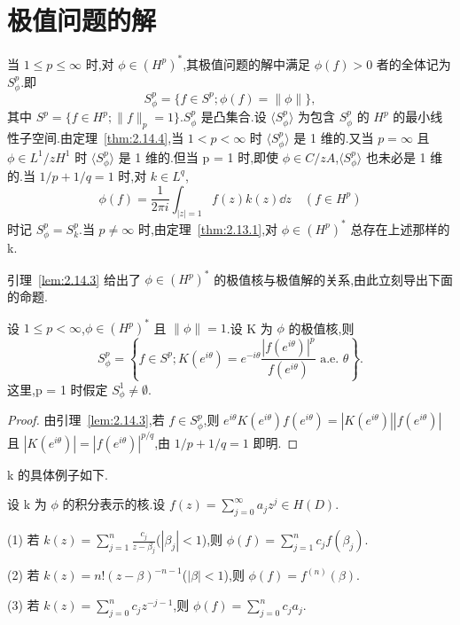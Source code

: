 \section{极值问题的解}\label{sec:2.16}

当 $1 \leq p \leq \infty$ 时,对 $\phi \in (H^{p})^{*}$,其极值问题的解中满足 $\phi(f) > 0$ 者的全体记为 $S_{\phi}^{p}$.即
\begin{equation*}
S_{\phi}^{p} = \{f \in S^{p}; \phi(f) = \|\phi\|\},
\end{equation*}
其中 $S^{p} = \{f \in H^{p}; \|f\|_{p} = 1\}$.$S_{\phi}^{p}$ 是凸集合.设 $\langle S_{\phi}^{p} \rangle$ 为包含 $S_{\phi}^{p}$ 的 $H^{p}$ 的最小线性子空间.由定理~\ref{thm:2.14.4},当 $1 < p < \infty$ 时 $\langle S_{\phi}^{p} \rangle$ 是 1 维的.又当 $p = \infty$ 且 $\phi \in L^{1}/zH^{1}$ 时 $\langle S_{\phi}^{p} \rangle$ 是 1 维的.但当 p = 1 时,即使 $\phi \in C/zA$,$\langle S_{\phi}^{p} \rangle$ 也未必是 1 维的.当 $1/p + 1/q = 1$ 时,对 $k \in L^{q}$,
\begin{equation*}
\phi(f) = \frac{1}{2\pi i}\int_{|z|=1} f(z) k(z)\dd z \quad (f \in H^{p})
\end{equation*}
时记 $S_{\phi}^{p} = S_{k}^{p}$.当 $p \neq \infty$ 时,由定理~\ref{thm:2.13.1},对 $\phi \in (H^{p})^{*}$ 总存在上述那样的 k.

引理~\ref{lem:2.14.3} 给出了 $\phi \in (H^{p})^{*}$ 的极值核与极值解的关系,由此立刻导出下面的命题.

\begin{proposition}\label{prop:2.16.1}
设 $1 \leq p < \infty$,$\phi \in (H^{p})^{*}$ 且 $\|\phi\| = 1$.设 K 为 $\phi$ 的极值核,则
\begin{equation*}
S_{\phi}^{p} = \left\{f \in S^{p}; K(e^{i\theta}) = e^{-i\theta}\frac{|f(e^{i\theta})|^{p}}{f(e^{i\theta})} \text{ a.e. } \theta \right\}.
\end{equation*}
这里,p = 1 时假定 $S_{\phi}^{1} \neq \emptyset$.
\end{proposition}

\begin{proof}
由引理~\ref{lem:2.14.3},若 $f \in S_{\phi}^{p}$,则 $e^{i\theta}K(e^{i\theta})f(e^{i\theta}) = |K(e^{i\theta})||f(e^{i\theta})|$ 且 $|K(e^{i\theta})| = |f(e^{i\theta})|^{p/q}$,由 $1/p + 1/q = 1$ 即明.
\end{proof}

k 的具体例子如下.

\begin{example}\label{exa:2.16.2}
设 k 为 $\phi$ 的积分表示的核.设 $f(z) = \sum_{j=0}^{\infty} a_{j}z^{j} \in H(D)$.

(1) 若 $k(z) = \sum_{j=1}^{n}\frac{c_{j}}{z - \beta_{j}}$($|\beta_{j}| < 1$),则 $\phi(f) = \sum_{j=1}^{n} c_{j}f(\beta_{j})$.

(2) 若 $k(z) = n!(z-\beta)^{-n-1}$($|\beta| < 1$),则 $\phi(f) = f^{(n)}(\beta)$.

(3) 若 $k(z) = \sum_{j=0}^{n} c_{j}z^{-j-1}$,则 $\phi(f) = \sum_{j=0}^{n} c_{j}a_{j}$.
\end{example}

